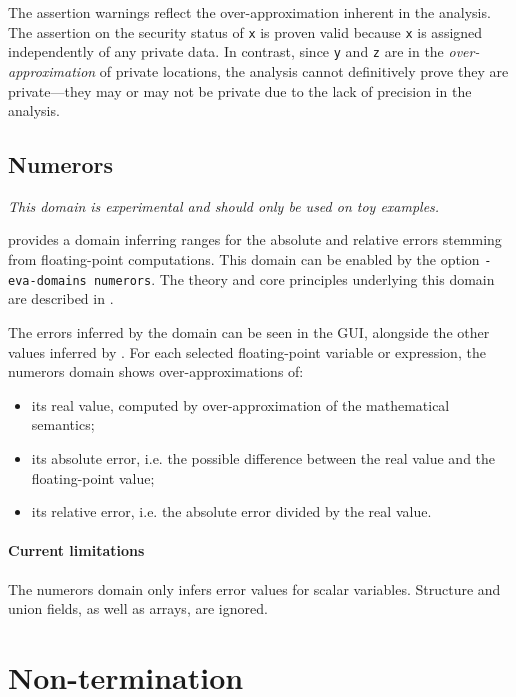 \documentclass{frama-c-book}
\begin{document}
The assertion warnings reflect the over-approximation inherent in the analysis.
The assertion on the security status of \lstinline|x| is proven valid because
\lstinline|x| is assigned independently of any private data. In contrast, since
\lstinline|y| and \lstinline|z| are in the \emph{over-approximation} of private
locations, the analysis cannot definitively prove they are private---they may or
may not be private due to the lack of precision in the analysis.

\subsection{Numerors}
\label{sec:numerors}

\emph{This domain is experimental and should only be used on toy examples.}

\Eva{} provides a domain inferring ranges for the absolute and relative errors
stemming from floating-point computations. This domain can be enabled by the
option \texttt{-eva-domains numerors}. The theory and core principles underlying
this domain are described in \cite{DBLP:conf/sas/JacqueminPV18}.

The errors inferred by the domain can be seen in the GUI, alongside the other
values inferred by \Eva{}.
For each selected floating-point variable or expression, the numerors domain
shows over-approximations of:
\begin{itemize}
\item its real value, computed by over-approximation of the mathematical
  semantics;
\item its absolute error, i.e. the possible difference between the real value
  and the floating-point value;
\item its relative error, i.e. the absolute error divided by the real value.
\end{itemize}

\paragraph{Current limitations}

The numerors domain only infers error values for scalar variables. Structure
and union fields, as well as arrays, are ignored.

\section{Non-termination}\label{nonterm}
\end{document}

